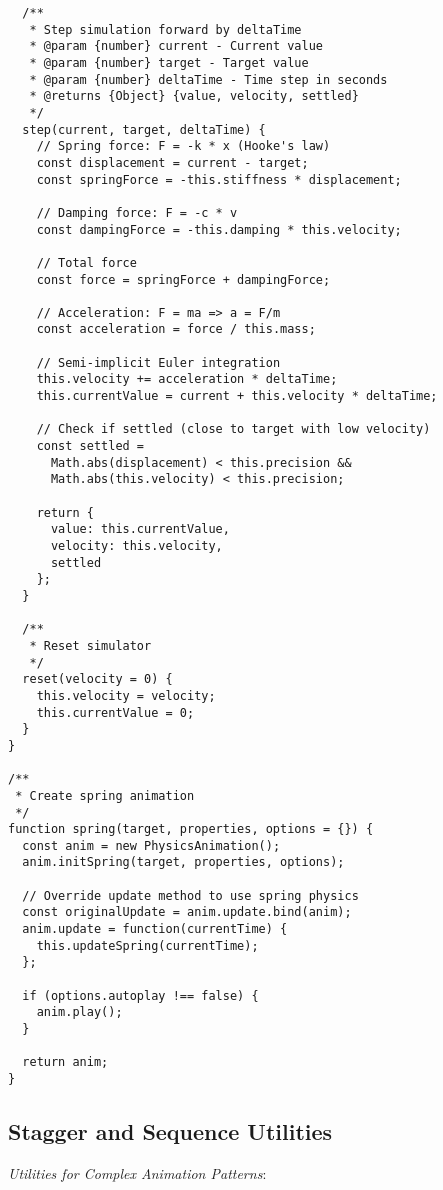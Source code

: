 \documentclass[11pt]{article}
\begin{document}
\begin{verbatim}
  /**
   * Step simulation forward by deltaTime
   * @param {number} current - Current value
   * @param {number} target - Target value
   * @param {number} deltaTime - Time step in seconds
   * @returns {Object} {value, velocity, settled}
   */
  step(current, target, deltaTime) {
    // Spring force: F = -k * x (Hooke's law)
    const displacement = current - target;
    const springForce = -this.stiffness * displacement;
    
    // Damping force: F = -c * v
    const dampingForce = -this.damping * this.velocity;
    
    // Total force
    const force = springForce + dampingForce;
    
    // Acceleration: F = ma => a = F/m
    const acceleration = force / this.mass;
    
    // Semi-implicit Euler integration
    this.velocity += acceleration * deltaTime;
    this.currentValue = current + this.velocity * deltaTime;
    
    // Check if settled (close to target with low velocity)
    const settled = 
      Math.abs(displacement) < this.precision &&
      Math.abs(this.velocity) < this.precision;
    
    return {
      value: this.currentValue,
      velocity: this.velocity,
      settled
    };
  }
  
  /**
   * Reset simulator
   */
  reset(velocity = 0) {
    this.velocity = velocity;
    this.currentValue = 0;
  }
}

/**
 * Create spring animation
 */
function spring(target, properties, options = {}) {
  const anim = new PhysicsAnimation();
  anim.initSpring(target, properties, options);
  
  // Override update method to use spring physics
  const originalUpdate = anim.update.bind(anim);
  anim.update = function(currentTime) {
    this.updateSpring(currentTime);
  };
  
  if (options.autoplay !== false) {
    anim.play();
  }
  
  return anim;
}
\end{verbatim}
\subsection{Stagger and Sequence Utilities}
\label{sec:org8d00fd9}

\emph{Utilities for Complex Animation Patterns}:
\end{document}
